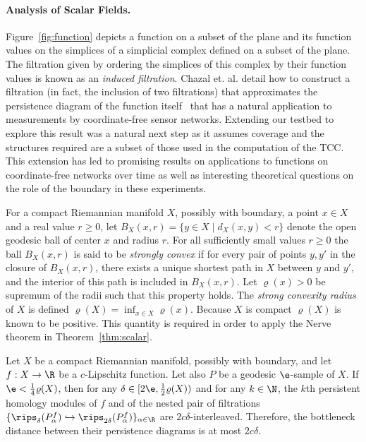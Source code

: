 \paragraph*{\textbf{Analysis of Scalar Fields.}} %
\label{par:stability_of_persistent}

Figure~\ref{fig:function} depicts a function on a subset of the plane and its function values on the simplices of a simplicial complex defined on a subset of the plane.
The filtration given by ordering the simplices of this complex by their function values is known as an \emph{induced filtration}.
Chazal et. al. detail how to construct a filtration (in fact, the inclusion of two filtrations) that approximates the persistence diagram of the function itself~\cite{chazal09analysis} that has a natural application to measurements by coordinate-free sensor networks.
Extending our testbed to explore this result was a natural next step as it assumes coverage and the structures required are a subset of those used in the computation of the TCC.
This extension has led to promising results on applications to functions on coordinate-free networks over time as well as interesting theoretical questions on the role of the boundary in these experiments.

For a compact Riemannian manifold $X$, possibly with boundary, a point $x\in X$ and a real value $r\geq 0$, let $B_X(x, r) = \{y\in X\mid d_X(x,y) < r\}$ denote the open geodesic ball of center $x$ and radius $r$.
For all sufficiently small values $r\geq 0$ the ball $B_X(x,r)$ is said to be \emph{strongly convex} if for every pair of points $y,y'$ in the closure of $B_X(x, r)$, there exists a unique shortest path in $X$ between $y$ and $y'$, and the interior of this path is included in $B_X(x, r)$.
Let $\varrho(x) > 0$ be supremum of the radii such that this property holds.
The \emph{strong convexity radius} of $X$ is defined $\varrho(X) = \inf_{x\in X}\varrho(x)$.
Because $X$ is compact $\varrho(X)$ is known to be positive.
This quantity is required in order to apply the Nerve theorem in Theorem~\ref{thm:scalar}.

\begin{theorem}\label{thm:scalar}
    Let $X$ be a compact Riemannian manifold, possibly with boundary, and let $f:X\to\R$ be a $c$-Lipschitz function.
    Let also $P$ be a geodesic $\e$-sample of $X$.
    If $\e < \frac{1}{4}\varrho(X)$, then for any $\delta\in [2\e,\frac{1}{2}\varrho(X))$ and for any $k\in\N$, the $k$th persistent homology modules of $f$ and of the nested pair of filtrations $\{\rips_\delta(P_\alpha^f)\hookrightarrow \rips_{2\delta}(P_\alpha^f)\}_{\alpha\in\R}$ are $2c\delta$-interleaved.
    Therefore, the bottleneck distance between their persistence diagrams is at most $2c\delta$.
\end{theorem}

